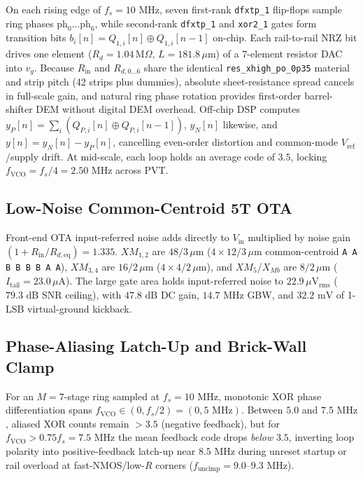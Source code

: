 \documentclass[10pt,twocolumn,letterpaper]{article}
\begin{document}
On each rising edge of $f_s=10\text{ MHz}$, seven first-rank \texttt{dfxtp\_1} flip-flops sample ring phases $\text{ph}_0\dots\text{ph}_6$, while second-rank \texttt{dfxtp\_1} and \texttt{xor2\_1} gates form transition bits $b_i[n]=Q_{1,i}[n]\oplus Q_{1,i}[n-1]$ on-chip. Each rail-to-rail NRZ bit drives one element ($R_d=1.04\,\text{M}\Omega$, $L=181.8\,\mu\text{m}$) of a 7-element resistor DAC into $v_g$. Because $R_{\text{in}}$ and $R_{d,0\dots6}$ share the identical \texttt{res\_xhigh\_po\_0p35} material and strip pitch (42 strips plus dummies), absolute sheet-resistance spread cancels in full-scale gain, and natural ring phase rotation provides first-order barrel-shifter DEM without digital DEM overhead. Off-chip DSP computes $y_P[n]=\sum_i(Q_{P,i}[n]\oplus Q_{P,i}[n-1])$, $y_N[n]$ likewise, and $y[n]=y_N[n]-y_P[n]$, cancelling even-order distortion and common-mode $V_{\text{ref}}$/supply drift. At mid-scale, each loop holds an average code of $3.5$, locking $f_{\text{VCO}}=f_s/4=2.50\text{ MHz}$ across PVT.

\subsection{Low-Noise Common-Centroid 5T OTA}
Front-end OTA input-referred noise adds directly to $V_{\text{in}}$ multiplied by noise gain $(1+R_{\text{in}}/R_{d,\text{eq}})=1.335$. $XM_{1,2}$ are $48/3\,\mu\text{m}$ ($4\times12/3\,\mu\text{m}$ common-centroid \texttt{A A B B B B A A}), $XM_{3,4}$ are $16/2\,\mu\text{m}$ ($4\times4/2\,\mu\text{m}$), and $XM_5$/$X_{Mb}$ are $8/2\,\mu\text{m}$ ($I_{\text{tail}}=23.0\,\mu\text{A}$). The large gate area holds input-referred noise to $22.9\,\mu\text{V}_{\text{rms}}$ ($79.3\text{ dB}$ SNR ceiling), with $47.8\text{ dB}$ DC gain, $14.7\text{ MHz}$ GBW, and $32.2\text{ mV}$ of 1-LSB virtual-ground kickback.

\subsection{Phase-Aliasing Latch-Up and Brick-Wall Clamp}
For an $M=7$-stage ring sampled at $f_s=10\text{ MHz}$, monotonic XOR phase differentiation spans $f_{\text{VCO}}\in(0,f_s/2)=(0,5\text{ MHz})$. Between $5.0$ and $7.5\text{ MHz}$, aliased XOR counts remain $>3.5$ (negative feedback), but for $f_{\text{VCO}}>0.75 f_s=7.5\text{ MHz}$ the mean feedback code drops \emph{below} $3.5$, inverting loop polarity into positive-feedback latch-up near $8.5\text{ MHz}$ during unreset startup or rail overload at fast-NMOS/low-$R$ corners ($f_{\text{unclmp}}=9.0$--$9.3\text{ MHz}$).
\end{document}
